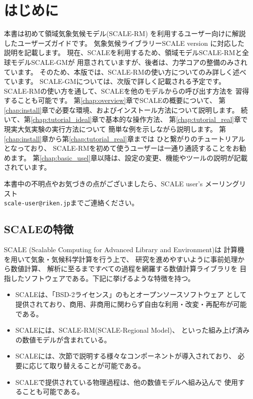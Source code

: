 \section{はじめに} \label{sec:introduction}

本書は初めて領域気象気候モデル(SCALE-RM)
を利用するユーザー向けに解説したユーザーズガイドです。
気象気候ライブラリーSCALE version \version に対応した説明を記載します。
現在、SCALEを利用するため、領域モデルSCALE-RMと全球モデルSCALE-GMが
用意されていますが、後者は、力学コアの整備のみされています。
そのため、本版では、SCALE-RMの使い方についてのみ詳しく述べています。
SCALE-GMについては、次版で詳しく記載される予定です。
SCALE-RMの使い方を通して、SCALEを他のモデルからの呼び出す方法を
習得することも可能です。
第\ref{chap:overview}章でSCALEの概要について、
第\ref{chap:install}章で必要な環境、およびインストール方法について説明します。
続いて、第\ref{chap:tutorial_ideal}章で基本的な操作方法、
第\ref{chap:tutorial_real}章で現実大気実験の実行方法について
簡単な例を示しながら説明します。
第\ref{chap:install}章から第\ref{chap:tutorial_real}章までは
ひと繋がりのチュートリアルとなっており、
SCALE-RMを初めて使うユーザーは一通り通読することをお勧めます。
第\ref{chap:basic_usel}章以降は、設定の変更、機能やツールの説明が記載されています。

本書中の不明点やお気づきの点がございましたら、SCALE user's メーリングリスト\\
 \verb|scale-user@riken.jp|までご連絡ください。



\subsection{SCALEの特徴} \label{subsec:scale_feature}

SCALE (Scalable Computing for Advanced Library and Environment)は
計算機を用いて気象・気候科学計算を行う上で、
研究を進めやすいように事前処理から数値計算、
解析に至るまですべての過程を網羅する数値計算ライブラリを
目指したソフトウェアである。下記に挙げるような特徴を持つ。
\begin{itemize}
\item SCALEは、「BSD-2ライセンス」のもとオープンソースソフトウェア
として提供されており、商用、非商用に関わらず自由な利用・改変・再配布が可能である。
\item SCALEには、SCALE-RM(SCALE-Regional Model)、
といった組み上げ済みの数値モデルが含まれている。
\item SCALEには、次節で説明する様々なコンポーネントが導入されており、
必要に応じて取り替えることが可能である。
\item SCALEで提供されている物理過程は、他の数値モデルへ組み込んで
使用することも可能である。
\end{itemize}

